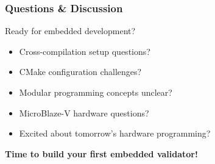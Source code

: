 \documentclass{beamer}
\begin{document}
\begin{frame}
\frametitle{Questions \& Discussion}
\begin{center}
\Large Ready for embedded development?
\end{center}

\begin{itemize}
    \item Cross-compilation setup questions?
    \item CMake configuration challenges?
    \item Modular programming concepts unclear?
    \item MicroBlaze-V hardware questions?
    \item Excited about tomorrow's hardware programming?
\end{itemize}

\vspace{1cm}
\begin{center}
\textbf{Time to build your first embedded validator!}
\end{center}
\end{frame}
\end{document}
